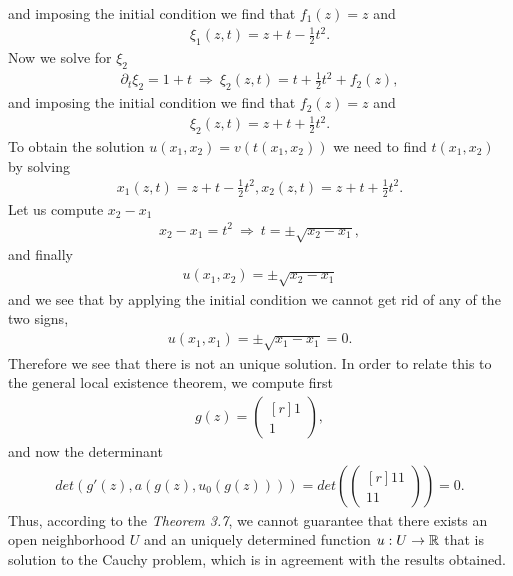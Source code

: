 \begin{questions}
\begin{solution}
and imposing the initial condition we find that $f_1(z)=z$ and
\begin{align*}
\xi_1(z,t)=z+t-\frac{1}{2}t^2.
\end{align*}
Now we solve for $\xi_2$
\begin{align*}
\partial_t\xi_2=1+t~\Rightarrow~\xi_2(z,t)=t+\frac{1}{2}t^2+f_2(z),
\end{align*}
and imposing the initial condition we find that $f_2(z)=z$ and
\begin{align*}
\xi_2(z,t)=z+t+\frac{1}{2}t^2.
\end{align*}
To obtain the solution $u(x_1,x_2)=v(t(x_1,x_2))$ we need to find $t(x_1,x_2)$ by solving
\begin{align*}
x_1(z,t)=z+t-\frac{1}{2}t^2,
x_2(z,t)=z+t+\frac{1}{2}t^2.
\end{align*}
Let us compute $x_2-x_1$
\begin{align*}
x_2-x_1=t^2~\Rightarrow~t=\pm\sqrt{x_2-x_1},
\end{align*}
and finally
\begin{align*}
u(x_1,x_2)=\pm\sqrt{x_2-x_1}
\end{align*}
and we see that by applying the initial condition we cannot get rid of any of the two signs,
\begin{align*}
u(x_1,x_1)=\pm\sqrt{x_1-x_1}=0.
\end{align*}
Therefore we see that there is not an unique solution. In order to relate this to the general local existence theorem, we compute first
\begin{align*}
g(z)=\begin{pmatrix*}[r]
1\\
1
\end{pmatrix*},
\end{align*}
and now the determinant
\begin{align*}
det(g'(z),a(g(z),u_0(g(z))))=det\left(\begin{pmatrix*}[r]
1 1\\
1 1
\end{pmatrix*}\right)=0.
\end{align*}
Thus, according to the \textsl{Theorem 3.7}, we cannot guarantee that there exists an open neighborhood $U$ and an uniquely determined function $u:U\rightarrow\mathbb{R}$ that is solution to the Cauchy problem, which is in agreement with the results obtained.
\end{solution}

\end{questions}